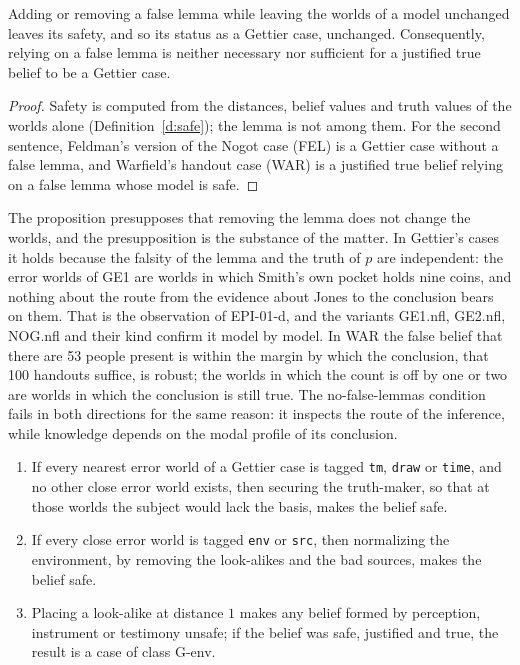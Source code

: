 \documentclass{situationist-preprint}
\begin{document}
\begin{proposition}\label{p:lemma}
Adding or removing a false lemma while leaving the worlds of a model unchanged leaves its safety, and so its status as a Gettier case, unchanged. Consequently, relying on a false lemma is neither necessary nor sufficient for a justified true belief to be a Gettier case.
\end{proposition}

\begin{proof}
Safety is computed from the distances, belief values and truth values of the worlds alone (Definition~\ref{d:safe}); the lemma is not among them. For the second sentence, Feldman's version of the Nogot case (FEL) is a Gettier case without a false lemma, and Warfield's handout case (WAR) is a justified true belief relying on a false lemma whose model is safe.
\end{proof}

The proposition presupposes that removing the lemma does not change the worlds, and the presupposition is the substance of the matter. In Gettier's cases it holds because the falsity of the lemma and the truth of $p$ are independent: the error worlds of GE1 are worlds in which Smith's own pocket holds nine coins, and nothing about the route from the evidence about Jones to the conclusion bears on them. That is the observation of EPI-01-d, and the variants GE1.nfl, GE2.nfl, NOG.nfl and their kind confirm it model by model. In WAR the false belief that there are 53 people present is within the margin by which the conclusion, that 100 handouts suffice, is robust; the worlds in which the count is off by one or two are worlds in which the conclusion is still true. The no-false-lemmas condition fails in both directions for the same reason: it inspects the route of the inference, while knowledge depends on the modal profile of its conclusion.

\begin{proposition}\label{p:env}
\begin{enumerate}[label=(\alph*)]
\item If every nearest error world of a Gettier case is tagged \texttt{tm}, \texttt{draw} or \texttt{time}, and no other close error world exists, then securing the truth-maker, so that at those worlds the subject would lack the basis, makes the belief safe.
\item If every close error world is tagged \texttt{env} or \texttt{src}, then normalizing the environment, by removing the look-alikes and the bad sources, makes the belief safe.
\item Placing a look-alike at distance $1$ makes any belief formed by perception, instrument or testimony unsafe; if the belief was safe, justified and true, the result is a case of class G-env.
\end{enumerate}
\end{proposition}
\end{document}

